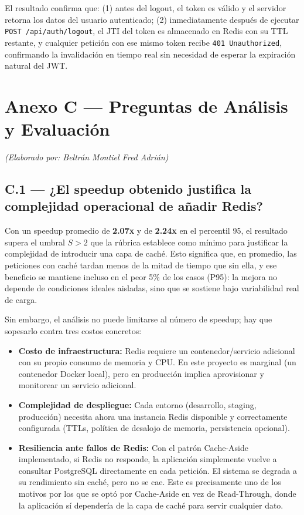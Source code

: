 \documentclass[12pt]{article}
\begin{document}
	El resultado confirma que: (1) antes del logout, el token es válido y el servidor retorna los datos del usuario autenticado; (2) inmediatamente después de ejecutar \texttt{POST /api/auth/logout}, el JTI del token es almacenado en Redis con su TTL restante, y cualquier petición con ese mismo token recibe \texttt{401 Unauthorized}, confirmando la invalidación en tiempo real sin necesidad de esperar la expiración natural del JWT.
	
	\newpage
	
	\section*{Anexo C — Preguntas de Análisis y Evaluación}
	
	\textit{(Elaborado por: Beltrán Montiel Fred Adrián)}
	
	\subsection*{C.1 — ¿El speedup obtenido justifica la complejidad operacional de añadir Redis?}
	
	Con un speedup promedio de \textbf{2.07x} y de \textbf{2.24x} en el percentil 95, el resultado supera el umbral $S > 2$ que la rúbrica establece como mínimo para justificar la complejidad de introducir una capa de caché. Esto significa que, en promedio, las peticiones con caché tardan menos de la mitad de tiempo que sin ella, y ese beneficio se mantiene incluso en el peor 5\% de los casos (P95): la mejora no depende de condiciones ideales aisladas, sino que se sostiene bajo variabilidad real de carga.
	
	Sin embargo, el análisis no puede limitarse al número de speedup; hay que sopesarlo contra tres costos concretos:
	
	\begin{itemize}
		\item \textbf{Costo de infraestructura:} Redis requiere un contenedor/servicio adicional con su propio consumo de memoria y CPU. En este proyecto es marginal (un contenedor Docker local), pero en producción implica aprovisionar y monitorear un servicio adicional.
		\item \textbf{Complejidad de despliegue:} Cada entorno (desarrollo, staging, producción) necesita ahora una instancia Redis disponible y correctamente configurada (TTLs, política de desalojo de memoria, persistencia opcional).
		\item \textbf{Resiliencia ante fallos de Redis:} Con el patrón Cache-Aside implementado, si Redis no responde, la aplicación simplemente vuelve a consultar PostgreSQL directamente en cada petición. El sistema se degrada a su rendimiento sin caché, pero no se cae. Este es precisamente uno de los motivos por los que se optó por Cache-Aside en vez de Read-Through, donde la aplicación sí dependería de la capa de caché para servir cualquier dato.
	\end{itemize}
	
\end{document}
